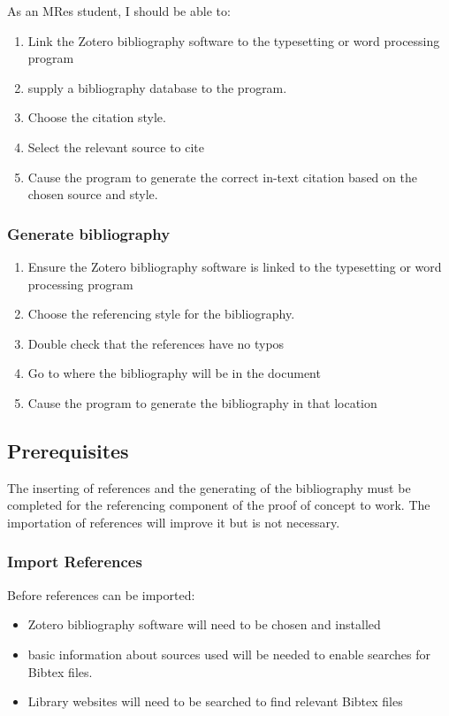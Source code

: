 \documentclass{article}
\begin{document}
As an MRes student, I should be able to: 
\begin{enumerate} 
\item Link the Zotero bibliography software to the typesetting or word processing program
\item supply a bibliography database to the program. 
\item Choose the citation style.
\item Select the relevant source to cite
\item Cause the program to generate the correct in-text citation based on the chosen source and style.
\end{enumerate} 

\subsubsection*{Generate bibliography}
\begin{enumerate} 
\item Ensure the Zotero bibliography software is linked to the typesetting or word processing program
\item Choose the referencing style for the bibliography.
\item Double check that the references have no typos
\item Go to where the bibliography will be in the document
\item Cause the program to generate the bibliography in that location
\end{enumerate} 


\subsection*{Prerequisites}

The inserting of references and the generating of the bibliography must be completed for the referencing component of the proof of concept to work. The importation of references will improve it but is not necessary.

\subsubsection*{Import References}

Before references can be imported:
\begin{itemize}
    \item Zotero bibliography software will need to be chosen and installed
    \item basic information about sources used will be needed to enable searches for Bibtex files.
    \item Library websites will need to be searched to find relevant Bibtex files
\end{itemize}
\end{document}
